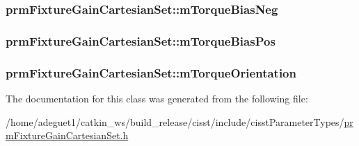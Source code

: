 \hypertarget{classprm_fixture_gain_cartesian_set_a0c7b126bd6be90c4b98c6a2578ce128c}{
\subsubsection[{m\-Torque\-Bias\-Neg}]{ prm\-Fixture\-Gain\-Cartesian\-Set\-::m\-Torque\-Bias\-Neg\hspace{0.3cm}{\ttfamily [protected]}}}\label{classprm_fixture_gain_cartesian_set_a0c7b126bd6be90c4b98c6a2578ce128c}
\hypertarget{classprm_fixture_gain_cartesian_set_ade2d22274560a61e66c2f0ea936a03ea}{
\subsubsection[{m\-Torque\-Bias\-Pos}]{ prm\-Fixture\-Gain\-Cartesian\-Set\-::m\-Torque\-Bias\-Pos\hspace{0.3cm}{\ttfamily [protected]}}}\label{classprm_fixture_gain_cartesian_set_ade2d22274560a61e66c2f0ea936a03ea}
\hypertarget{classprm_fixture_gain_cartesian_set_aef19880e3a8beec82d081f21f3ca9315}{
\subsubsection[{m\-Torque\-Orientation}]{ prm\-Fixture\-Gain\-Cartesian\-Set\-::m\-Torque\-Orientation\hspace{0.3cm}{\ttfamily [protected]}}}\label{classprm_fixture_gain_cartesian_set_aef19880e3a8beec82d081f21f3ca9315}


The documentation for this class was generated from the following file\-:\begin{DoxyCompactItemize}
\item 
/home/adeguet1/catkin\-\_\-ws/build\-\_\-release/cisst/include/cisst\-Parameter\-Types/\hyperlink{prm_fixture_gain_cartesian_set_8h}{prm\-Fixture\-Gain\-Cartesian\-Set.\-h}\end{DoxyCompactItemize}
